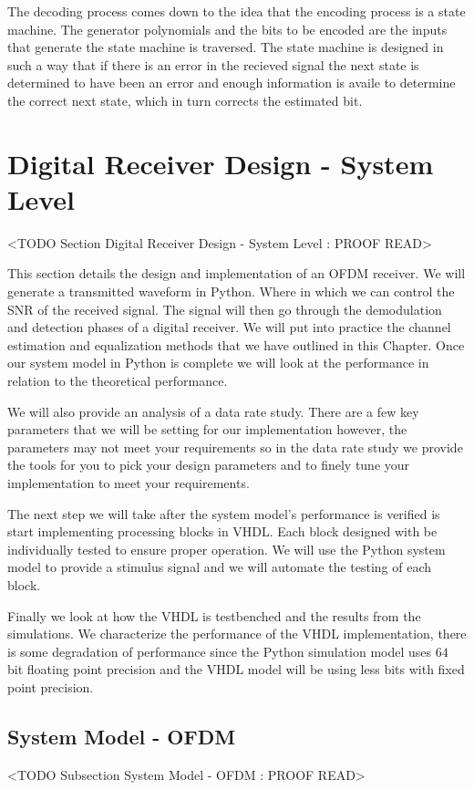 The decoding process comes down to the idea that the encoding process is a state machine. The generator polynomials and the bits to be encoded are the inputs that generate the state machine is traversed. The state machine is designed in such a way that if there is an error in the recieved signal the next state is determined to have been an error and enough information is availe to determine the correct next state, which in turn corrects the estimated bit.

\section{Digital Receiver Design - System Level}
	<TODO Section Digital Receiver Design - System Level : PROOF READ>

This section details the design and implementation of an \ac{OFDM} receiver. We will generate a transmitted waveform in Python. Where in which we can control the \ac{SNR} of the received signal. The signal will then go through the demodulation and detection phases of a digital receiver. We will put into practice the channel estimation and equalization methods that we have outlined in this Chapter. Once our system model in Python is complete we will look at the performance in relation to the theoretical performance.

We will also provide an analysis of a data rate study. There are a few key parameters that we will be setting for our implementation however, the parameters may not meet your requirements so in the data rate study we provide the tools for you to pick your design parameters and to finely tune your implementation to meet your requirements.

The next step we will take after the system model's performance is verified is start implementing processing blocks in \ac{VHDL}. Each block designed with be individually tested to ensure proper operation. We will use the Python system model to provide a stimulus signal and we will automate the testing of each block.

Finally we look at how the \ac{VHDL} is testbenched and the results from the simulations. We characterize the performance of the \ac{VHDL} implementation, there is some degradation of performance since the Python simulation model uses $64$ bit floating point precision and the \ac{VHDL} model will be using less bits with fixed point precision.

\subsection{System Model - OFDM}
 <TODO Subsection System Model - OFDM : PROOF READ>

